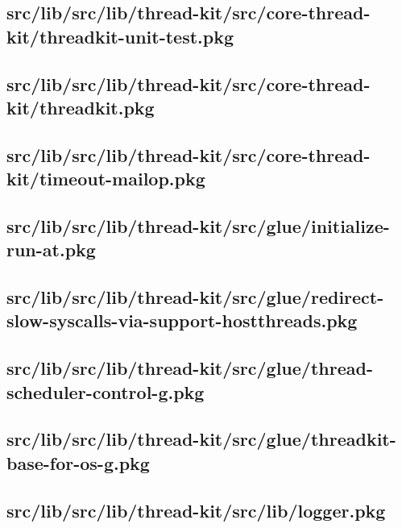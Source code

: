 \subsection{src/lib/src/lib/thread-kit/src/core-thread-kit/threadkit-unit-test.pkg}


\subsection{src/lib/src/lib/thread-kit/src/core-thread-kit/threadkit.pkg}


\subsection{src/lib/src/lib/thread-kit/src/core-thread-kit/timeout-mailop.pkg}


\subsection{src/lib/src/lib/thread-kit/src/glue/initialize-run-at.pkg}


\subsection{src/lib/src/lib/thread-kit/src/glue/redirect-slow-syscalls-via-support-hostthreads.pkg}


\subsection{src/lib/src/lib/thread-kit/src/glue/thread-scheduler-control-g.pkg}


\subsection{src/lib/src/lib/thread-kit/src/glue/threadkit-base-for-os-g.pkg}


\subsection{src/lib/src/lib/thread-kit/src/lib/logger.pkg}


